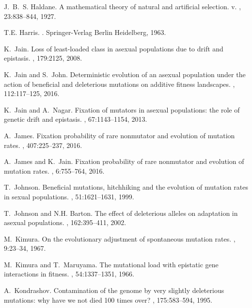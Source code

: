 \documentclass[preprint,12pt,number]{elsarticle}
\begin{document}
\begin{thebibliography}{10}
J.~B.~S. Haldane.
\newblock A mathematical theory of natural and artificial selection. v.
, 23:838--844, 1927.

T.E. Harris.
.
\newblock Springer-Verlag Berlin Heidelberg, 1963.

K.~Jain.
\newblock Loss of least-loaded class in asexual populations due to drift and
  epistasis.
, 179:2125, 2008.

K.~Jain and S.~John.
\newblock Deterministic evolution of an asexual population under the action of
  beneficial and deleterious mutations on additive fitness landscapes.
, 112:117--125, 2016.

K.~Jain and A.~Nagar.
\newblock Fixation of mutators in asexual populations: the role of genetic
  drift and epistasis.
, 67:1143--1154, 2013.

A.~James.
\newblock Fixation probability of rare nonmutator and evolution of mutation
  rates.
, 407:225--237, 2016.

A.~James and K.~Jain.
\newblock Fixation probability of rare nonmutator and evolution of mutation
  rates.
, 6:755--764, 2016.

T.~Johnson.
\newblock Beneficial mutations, hitchhiking and the evolution of mutation rates
  in sexual populations.
, 51:1621--1631, 1999.

T.~Johnson and N.H. Barton.
\newblock The effect of deleterious alleles on adaptation in asexual
  populations.
, 162:395--411, 2002.

M.~Kimura.
\newblock On the evolutionary adjustment of spontaneous mutation rates.
, 9:23--34, 1967.

M.~Kimura and T.~Maruyama.
\newblock The mutational load with epistatic gene interactions in fitness.
, 54:1337--1351, 1966.

A.~Kondrashov.
\newblock Contamination of the genome by very slightly deleterious mutations:
  why have we not died 100 times over?
, 175:583--594, 1995.


\end{thebibliography}
\end{document}
